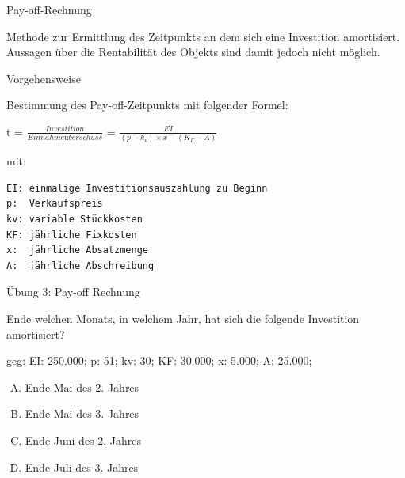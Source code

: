 \documentclass[12pt,ngerman,a4paper,ignorenonframetext,]{beamer}
\providecommand{\tightlist}{%
  \setlength{\itemsep}{0pt}\setlength{\parskip}{0pt}}
\begin{document}
\begin{frame}{Pay-off-Rechnung}
\protect\hypertarget{pay-off-rechnung}{}

Methode zur Ermittlung des Zeitpunkts an dem sich eine Investition
amortisiert. Aussagen über die Rentabilität des Objekts sind damit
jedoch nicht möglich.

\end{frame}

\begin{frame}[fragile]{Vorgehensweise}
\protect\hypertarget{vorgehensweise}{}

Bestimmung des Pay-off-Zeitpunkts mit folgender Formel:

t = \(\frac{Investition}{Einnahmeüberschuss}\) =
\(\frac{ EI }{(p-k_{ v })\times x-(K_{ F }-A)}\)

mit:

\begin{verbatim}
EI: einmalige Investitionsauszahlung zu Beginn 
p:  Verkaufspreis 
kv: variable Stückkosten 
KF: jährliche Fixkosten 
x:  jährliche Absatzmenge 
A:  jährliche Abschreibung 
\end{verbatim}

\end{frame}

\begin{frame}{Übung 3: Pay-off Rechnung}
\protect\hypertarget{ubung-3-pay-off-rechnung}{}

Ende welchen Monats, in welchem Jahr, hat sich die folgende Investition
amortisiert?

geg: EI: 250.000; p: 51; kv: 30; KF: 30.000; x: 5.000; A: 25.000;

\begin{enumerate}
[A.]
\tightlist
\item
  Ende Mai des 2. Jahres
\item
  Ende Mai des 3. Jahres
\item
  Ende Juni des 2. Jahres
\item
  Ende Juli des 3. Jahres
\end{enumerate}


\end{frame}
\end{document}
